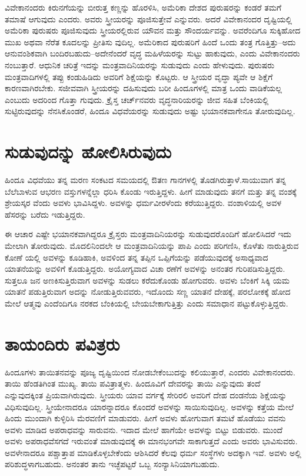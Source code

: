 ವಿವೇಕಾನಂದರು ಕಿರುನಗೆಯನ್ನು ಬೀರುತ್ತ ಕಣ್ಣನ್ನು ಹೊರಳಿಸಿ, ಅಮೆರಿಕಾ ದೇಶದ ಪುರುಷರನ್ನು ಕಂಡರೆ ತಮಗೆ ತಮಾಷೆ ಆಗುವುದು ಎಂದರು. ಅವರು ಸ್ತ್ರೀಯರನ್ನು ಪೂಜಿಸುತ್ತೇವೆ ಎನ್ನುವರು. ಅದರೆ ವಿವೇಕಾನಂದರ ದೃಷ್ಟಿಯಲ್ಲಿ ಅಮೆರಿಕಾ ಪುರುಷರು ಪೂಜಿಸುವುದು ಸ್ತ್ರೀಯರಲ್ಲಿರುವ ಯೌವನ ಮತ್ತು ಸೌಂದರ್ಯವನ್ನು. ಅವರೆಂದಿಗೂ ಸುಕ್ಕಿಹೋದ ಮುಖ ಅಥವಾ ನೆರೆತ ಕೂದಲನ್ನು ಪ್ರೀತಿಸು ವುದಿಲ್ಲ. ಅಮೆರಿಕಾದ ಪುರುಷರಿಗೆ ಹಿಂದೆ ಒಂದು ತಂತ್ರ ಗೊತ್ತಿತ್ತು–ಅದು ಆನುವಂಶಿಕವಾಗಿ ಬಂದಿರಬಹುದು–ಅದೇನೆಂದರೆ ವೃದ್ಧ ಮಹಿಳೆಯರನ್ನು ಸುಟ್ಟು ಹಾಕುವುದು, ಎಂದು ವಿವೇಕಾನಂದರು ನಂಬುತ್ತಾರೆ. ಆಧುನಿಕ ಚರಿತ್ರೆ ಇದನ್ನು ಮಂತ್ರವಾದಿನಿಯರನ್ನು ಸುಡುವುದು ಎಂದು ಹೇಳುವುದು. ಪುರುಷರು ಮಂತ್ರವಾದಿಗಳಲ್ಲಿ ತಪ್ಪು ಕಂಡುಹಿಡಿದು ಅವರಿಗೆ ಶಿಕ್ಷೆಯನ್ನು ಕೊಟ್ಟರು. ಆ ಸ್ತ್ರೀಯರ ವೃದ್ಧಾ ಪ್ಯವೇ ಆ ಶಿಕ್ಷೆಗೆ ಕಾರಣವಾಗಿರಬೇಕು. ಸಜೀವವಾಗಿ ಸ್ತ್ರೀಯರನ್ನು ದಹಿಸುವುದು ಬರೀ ಹಿಂದೂಗಳಲ್ಲಿ ಮಾತ್ರ ಒಂದು ವಾಡಿಕೆಯಲ್ಲ ಎಂಬುದು ಅದರಿಂದ ಗೊತ್ತಾ ಗುವುದು. ಕ್ರೈಸ್ತ ಚರ್ಚ್​ನವರು ವೃದ್ಧನಾರಿಯರನ್ನು ಜೀವ ಸಹಿತ ಬೆಂಕಿಯಲ್ಲಿ ಸುಟ್ಟಿರುವುದನ್ನು ನೆನಸಿಕೊಂಡರೆ, ಹಿಂದೂ ವಿಧವೆಯರನ್ನು ಸುಡುವುದು ಅಷ್ಟು ಭಯಾನಕವಾಗೇನೂ ತೋರುವುದಿಲ್ಲ.


\section{ಸುಡುವುದನ್ನು ಹೋಲಿಸಿರುವುದು}

ಹಿಂದೂ ವಿಧವೆಯು ತನ್ನ ಮರಣ ಸಂಕಟದ ಸಮಯದಲ್ಲಿ ಔತಣ ಗಾನಗಳಲ್ಲಿ ತೊಡಗಿರುತ್ತಾಳೆ.ಸಾಯುವಾಗ ತನ್ನ ಬೆಲೆಬಾಳುವ ಆಭರಣ ವಸ್ತುಗಳನ್ನೆಲ್ಲಾ ಧರಿಸಿ ಕೊಂಡು ಇರುತ್ತಿದ್ದಳು. ಹೀಗೆ ಮಾಡುವುದು ತನಗೆ ಮತ್ತು ತನ್ನ ವಂಶಕ್ಕೆ ಶ್ರೇಯಸ್ಕರ ವೆಂದು ಅವಳು ಭಾವಿಸಿದ್ದಳು. ಅವಳನ್ನು ಧರ್ಮವೀರಳೆಂದು ಕರೆಯುತ್ತಿದ್ದರು. ವಂಶಾಳಿಯಲ್ಲಿ ಅವಳ ಹೆಸರನ್ನು ಬರೆದು ಇಡುತ್ತಿದ್ದರು.

ಈ ಆಚಾರ ಎಷ್ಟೇ ಭಯಾನಕವಾಗಿದ್ದರೂ ಕ್ರೈಸ್ತರು ಮಂತ್ರವಾದಿನಿಯರನ್ನು ಸುಡುವುದರೊಂದಿಗೆ ಹೋಲಿಸಿದರೆ ಇದು ಮೇಲಾಗಿ ತೋರುವುದು. ಮೊದಲಿನಿಂದಲೇ ಆ ಮಂತ್ರವಾದಿನಿಯನ್ನು ಪಾಪಿ ಎಂದು ಪರಿಗಣಿಸಿ, ಕೊಳೆತು ನಾರುತ್ತಿರುವ ಕೋಣೆ ಯಲ್ಲಿ ಅವಳನ್ನು ಕೂಡಿಹಾಕಿ, ಅವಳಿಂದ ತನ್ನ ತಪ್ಪಿನ ಒಪ್ಪಿಗೆಯನ್ನು ಪಡೆಯುವುದಕ್ಕೆ ಅಸಾಧ್ಯವಾದ ಯಾತನೆಯನ್ನು ಅವಳಿಗೆ ಕೊಡುತ್ತಿದ್ದರು. ಅಯೋಗ್ಯವಾದ ವಿಚಾ ರಣೆಗೆ ಅವಳನ್ನು ಅನಂತರ ಗುರಿಪಡಿಸುತ್ತಿದ್ದರು. ಸುತ್ತಲೂ ಜನ ಅಣಕಿಸುತ್ತಿರುವಾಗ ಅವಳನ್ನು ಸುಡಲು ಕರೆದುಕೊಂಡು ಹೋಗುವರು. ಅವಳು ಬೆಂಕಿಗೆ ಸಿಕ್ಕಿ ಯಮ ಯಾತನೆ ಪಡುತ್ತಿರುವಾಗ ಅದನ್ನು ನೋಡುತ್ತಿರುವವರು, ಇದೊಂದು ಸಣ್ಣ ಯಾತನೆ ದೇಹಕ್ಕೆ, ಪರಲೋಕಕ್ಕೆ ಹೋದ ಮೇಲೆ ಆತ್ಮವು ಎಂದೆಂದಿಗೂ ನರಕದ ಬೆಂಕಿಯಲ್ಲಿ ಬೇಯಬೇಕಾಗುತ್ತಿತ್ತು ಎಂದು ಸಮಾಧಾನ ಪಟ್ಟುಕೊಳ್ಳುತ್ತಿದ್ದರು.

\delimiter


\section{ತಾಯಂದಿರು ಪವಿತ್ರರು}

ಹಿಂದೂಗಳು ತಾಯಿತನವನ್ನು ಪೂಜ್ಯ ದೃಷ್ಟಿಯಿಂದ ನೋಡಬೇಕೆಂಬುದನ್ನು ಕಲಿಯುತ್ತಾರೆ, ಎಂದರು ವಿವೇಕಾನಂದರು. ತಾಯಿ ಹೆಂಡತಿಗಿಂತ ಮುಖ್ಯ. ತಾಯಿ ಪವಿತ್ರಾತ್ಮಳು. ಹಿಂದೂವಿಗೆ ದೇವರನ್ನು ತಾಯಿ ಎನ್ನುವುದು ತಂದೆ ಎನ್ನುವುದಕ್ಕಿಂತ ಪ್ರಿಯವಾಗಿರುವುದು. ಸ್ತ್ರೀಯರು ಯಾವ ವರ್ಗಕ್ಕೆ ಸೇರಿರಲಿ ಅವರಿಗೆ ದೇಹ ದಂಡನೆಯ ಶಿಕ್ಷೆಯನ್ನು ವಿಧಿಸುವುದಿಲ್ಲ. ಸ್ತ್ರೀಯೇನಾದರೂ ಯಾರನ್ನಾದರೂ ಕೊಂದರೆ ಅವಳನ್ನು ಸಾಯಿಸುವುದಿಲ್ಲ. ಅವಳನ್ನು ಕತ್ತೆಯ ಮೇಲೆ ಹಿಂದು ಮುಂದಾಗಿ ಕುಳ್ಳಿರಿಸಿ ಮೆರವಣಿಗೆ ಮಾಡುವರು. ಹೀಗೆ ಅವಳು ಹೋಗುವಾಗ ತಮಟೆ ಹೊಡೆಯು ವವನು ಅವಳು ಮಾಡಿದ ಅಪರಾಧವನ್ನು ಸಾರುವನು. ಇದಾದ ಮೇಲೆ ಹಾಗೆಯೇ ಅವಳನ್ನು ಬಿಟ್ಟು ಬಿಡುವರು. ಮುಂದೆ ಅವಳು ಅಪರಾಧವೆಸಗದೆ ಇರುವಂತೆ ಮಾಡುವುದಕ್ಕೆ ಈ ಮಾನಭಂಗವೇ ಸಾಕಾಗುತ್ತದೆ ಎಂದು ಅವರು ಭಾವಿಸುವರು. ಅವಳೇನಾದರೂ ಪಶ್ಚಾತ್ತಾಪ ಮಾಡಿಕೊಳ್ಳಬೇಕೆಂದು ಆಶಿಸಿದರೆ ಕೆಲವು ಧರ್ಮ ಸಂಸ್ಥೆಗಳು ಅದಕ್ಕಾಗಿ ಇವೆ. ಅವಳು ಅಲ್ಲಿ ಪರಿಶುದ್ಧಳಾಗಬಹುದು. ಅನಂತರ ತಾನು ಇಚ್ಛೆಪಟ್ಟರೆ ಒಬ್ಬ ಸಂನ್ಯಾಸಿನಿಯಾಗಬಹುದು.

